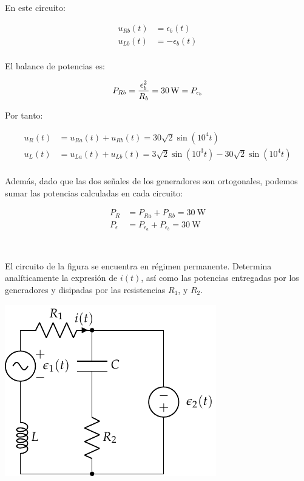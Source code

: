 \documentclass[12pt]{article}
\begin{document}
En este circuito:

\begin{align*}
  u_{Rb}(t) &= \epsilon_b(t)\\
  u_{Lb}(t) &= -\epsilon_b(t)\\  
\end{align*}

El balance de potencias es:

\begin{equation*}
  P_{Rb} = \frac{\epsilon_b^2}{R_b} = \SI{30}{\watt} = P_{\epsilon_b}\\
\end{equation*}

Por tanto:

\begin{align*}
  u_R(t) &= u_{Ra}(t) + u_{Rb}(t) = 30\sqrt{2}\sin(10^4 t)\\
  u_L(t) &= u_{La}(t) + u_{Lb}(t) = 3\sqrt{2}\sin(10^3 t) - 30\sqrt{2}\sin(10^4 t)\\
\end{align*}

Además, dado que las dos señales de los generadores son ortogonales, podemos sumar las potencias calculadas en cada circuito:

\begin{align*}
  P_R &= P_{Ra} + P_{Rb} = \SI{30}{\watt}\\
  P_\epsilon &= P_{\epsilon_a} + P_{\epsilon_b} = \SI{30}{\watt}\\
\end{align*}

\clearpage

\section{}

El circuito de la figura se encuentra en régimen permanente. Determina
analíticamente la expresión de $i(t)$, así como las potencias entregadas por los
generadores y disipadas por las resistencias $R_1$, y $R_2$.
\begin{center}
\includegraphics{figs/superposicion1}
\end{center}
\end{document}
